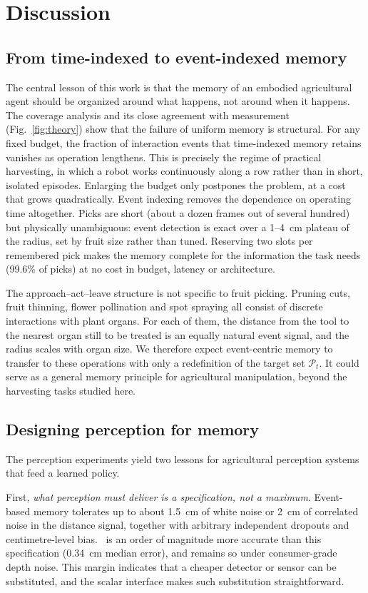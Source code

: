 \section{Discussion}
\label{sec:discussion}

\subsection{From time-indexed to event-indexed memory}
The central lesson of this work is that the memory of an embodied agricultural agent should be organized around what happens, not around when it happens. The coverage analysis and its close agreement with measurement (Fig.~\ref{fig:theory}) show that the failure of uniform memory is structural. For any fixed budget, the fraction of interaction events that time-indexed memory retains vanishes as operation lengthens. This is precisely the regime of practical harvesting, in which a robot works continuously along a row rather than in short, isolated episodes. Enlarging the budget only postpones the problem, at a cost that grows quadratically. Event indexing removes the dependence on operating time altogether. Picks are short (about a dozen frames out of several hundred) but physically unambiguous: event detection is exact over a 1--4~cm plateau of the radius, set by fruit size rather than tuned. Reserving two slots per remembered pick makes the memory complete for the information the task needs (99.6\% of picks) at no cost in budget, latency or architecture.

The approach--act--leave structure is not specific to fruit picking. Pruning cuts, fruit thinning, flower pollination and spot spraying all consist of discrete interactions with plant organs. For each of them, the distance from the tool to the nearest organ still to be treated is an equally natural event signal, and the radius scales with organ size. We therefore expect event-centric memory to transfer to these operations with only a redefinition of the target set $\mathcal{P}_t$. It could serve as a general memory principle for agricultural manipulation, beyond the harvesting tasks studied here.

\subsection{Designing perception for memory}
The perception experiments yield two lessons for agricultural perception systems that feed a learned policy.

First, \emph{what perception must deliver is a specification, not a maximum}. Event-based memory tolerates up to about 1.5~cm of white noise or 2~cm of correlated noise in the distance signal, together with arbitrary independent dropouts and centimetre-level bias. \fdm\ is an order of magnitude more accurate than this specification (0.34~cm median error), and remains so under consumer-grade depth noise. This margin indicates that a cheaper detector or sensor can be substituted, and the scalar interface makes such substitution straightforward.

